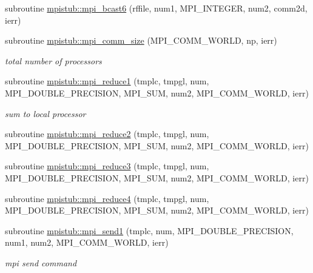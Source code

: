 \begin{DoxyCompactItemize}
\item 
subroutine \mbox{\hyperlink{namespacempistub_aca21309e40e0374a92a5e2a163110d1c}{mpistub\+::mpi\+\_\+bcast6}} (rffile, num1, M\+P\+I\+\_\+\+I\+N\+T\+E\+G\+ER, num2, comm2d, ierr)
\item 
subroutine \mbox{\hyperlink{namespacempistub_a188b67a76569dcb918a27f48018e6baf}{mpistub\+::mpi\+\_\+comm\+\_\+size}} (M\+P\+I\+\_\+\+C\+O\+M\+M\+\_\+\+W\+O\+R\+LD, np, ierr)
\begin{DoxyCompactList}\small\item\em total number of processors \end{DoxyCompactList}\item 
subroutine \mbox{\hyperlink{namespacempistub_a6ba478c1e620c237eb85776943b327ad}{mpistub\+::mpi\+\_\+reduce1}} (tmplc, tmpgl, num, M\+P\+I\+\_\+\+D\+O\+U\+B\+L\+E\+\_\+\+P\+R\+E\+C\+I\+S\+I\+ON, M\+P\+I\+\_\+\+S\+UM, num2, M\+P\+I\+\_\+\+C\+O\+M\+M\+\_\+\+W\+O\+R\+LD, ierr)
\begin{DoxyCompactList}\small\item\em sum to local processor \end{DoxyCompactList}\item 
subroutine \mbox{\hyperlink{namespacempistub_a1b64afd5481e729d54724f7427b4a32f}{mpistub\+::mpi\+\_\+reduce2}} (tmplc, tmpgl, num, M\+P\+I\+\_\+\+D\+O\+U\+B\+L\+E\+\_\+\+P\+R\+E\+C\+I\+S\+I\+ON, M\+P\+I\+\_\+\+S\+UM, num2, M\+P\+I\+\_\+\+C\+O\+M\+M\+\_\+\+W\+O\+R\+LD, ierr)
\item 
subroutine \mbox{\hyperlink{namespacempistub_a781c5f26f7ee9bdffdc195be7eaa07ef}{mpistub\+::mpi\+\_\+reduce3}} (tmplc, tmpgl, num, M\+P\+I\+\_\+\+D\+O\+U\+B\+L\+E\+\_\+\+P\+R\+E\+C\+I\+S\+I\+ON, M\+P\+I\+\_\+\+S\+UM, num2, M\+P\+I\+\_\+\+C\+O\+M\+M\+\_\+\+W\+O\+R\+LD, ierr)
\item 
subroutine \mbox{\hyperlink{namespacempistub_ad1156be68f1c3c3dd3d844d6d4cee160}{mpistub\+::mpi\+\_\+reduce4}} (tmplc, tmpgl, num, M\+P\+I\+\_\+\+D\+O\+U\+B\+L\+E\+\_\+\+P\+R\+E\+C\+I\+S\+I\+ON, M\+P\+I\+\_\+\+S\+UM, num2, M\+P\+I\+\_\+\+C\+O\+M\+M\+\_\+\+W\+O\+R\+LD, ierr)
\item 
subroutine \mbox{\hyperlink{namespacempistub_aa276a91b8fd09a5bf247b20692731dd8}{mpistub\+::mpi\+\_\+send1}} (tmplc, num, M\+P\+I\+\_\+\+D\+O\+U\+B\+L\+E\+\_\+\+P\+R\+E\+C\+I\+S\+I\+ON, num1, num2, M\+P\+I\+\_\+\+C\+O\+M\+M\+\_\+\+W\+O\+R\+LD, ierr)
\begin{DoxyCompactList}\small\item\em mpi send command \end{DoxyCompactList}\item 

\end{DoxyCompactItemize}
